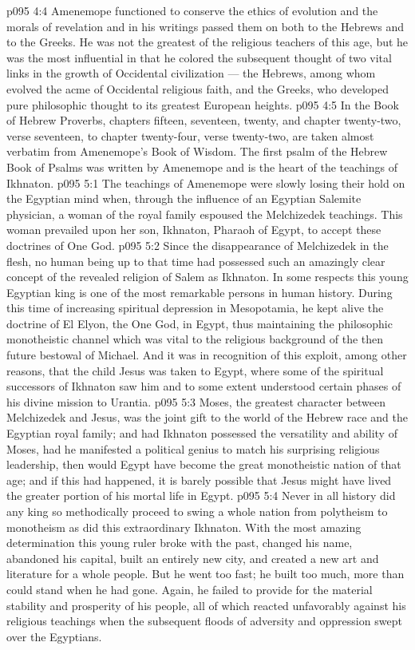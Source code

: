 \vs p095 4:4 Amenemope functioned to conserve the ethics of evolution and the morals of revelation and in his writings passed them on both to the Hebrews and to the Greeks. He was not the greatest of the religious teachers of this age, but he was the most influential in that he colored the subsequent thought of two vital links in the growth of Occidental civilization --- the Hebrews, among whom evolved the acme of Occidental religious faith, and the Greeks, who developed pure philosophic thought to its greatest European heights.
\vs p095 4:5 \pc In the Book of Hebrew Proverbs, chapters fifteen, seventeen, twenty, and chapter twenty\hyp{}two, verse seventeen, to chapter twenty\hyp{}four, verse twenty\hyp{}two, are taken almost verbatim from Amenemope’s Book of Wisdom. The first psalm of the Hebrew Book of Psalms was written by Amenemope and is the heart of the teachings of Ikhnaton.
\vs p095 5:1 The teachings of Amenemope were slowly losing their hold on the Egyptian mind when, through the influence of an Egyptian Salemite physician, a woman of the royal family espoused the Melchizedek teachings. This woman prevailed upon her son, Ikhnaton, Pharaoh of Egypt, to accept these doctrines of One God.
\vs p095 5:2 Since the disappearance of Melchizedek in the flesh, no human being up to that time had possessed such an amazingly clear concept of the revealed religion of Salem as Ikhnaton. In some respects this young Egyptian king is one of the most remarkable persons in human history. During this time of increasing spiritual depression in Mesopotamia, he kept alive the doctrine of El Elyon, the One God, in Egypt, thus maintaining the philosophic monotheistic channel which was vital to the religious background of the then future bestowal of Michael. And it was in recognition of this exploit, among other reasons, that the child Jesus was taken to Egypt, where some of the spiritual successors of Ikhnaton saw him and to some extent understood certain phases of his divine mission to Urantia.
\vs p095 5:3 Moses, the greatest character between Melchizedek and Jesus, was the joint gift to the world of the Hebrew race and the Egyptian royal family; and had Ikhnaton possessed the versatility and ability of Moses, had he manifested a political genius to match his surprising religious leadership, then would Egypt have become the great monotheistic nation of that age; and if this had happened, it is barely possible that Jesus might have lived the greater portion of his mortal life in Egypt.
\vs p095 5:4 Never in all history did any king so methodically proceed to swing a whole nation from polytheism to monotheism as did this extraordinary Ikhnaton. With the most amazing determination this young ruler broke with the past, changed his name, abandoned his capital, built an entirely new city, and created a new art and literature for a whole people. But he went too fast; he built too much, more than could stand when he had gone. Again, he failed to provide for the material stability and prosperity of his people, all of which reacted unfavorably against his religious teachings when the subsequent floods of adversity and oppression swept over the Egyptians.
